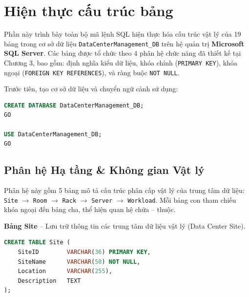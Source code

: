 \section{Hiện thực cấu trúc bảng}

Phần này trình bày toàn bộ mã lệnh SQL hiện thực hóa cấu trúc vật lý của 19 bảng trong cơ sở dữ liệu \texttt{DataCenterManagement\_DB} trên hệ quản trị \textbf{Microsoft SQL Server}. Các bảng được tổ chức theo 4 phân hệ chức năng đã thiết kế tại Chương 3, bao gồm: định nghĩa kiểu dữ liệu, khóa chính (\texttt{PRIMARY KEY}), khóa ngoại (\texttt{FOREIGN KEY REFERENCES}), và ràng buộc \texttt{NOT NULL}.

\vspace{0.5em}
\noindent Trước tiên, tạo cơ sở dữ liệu và chuyển ngữ cảnh sử dụng:

\begin{tcolorbox}[colback=gray!5, colframe=gray!60, title={\textbf{Khởi tạo Database}}, fonttitle=\bfseries\small, boxrule=0.5pt, arc=2pt]
\begin{lstlisting}[language=SQL, basicstyle=\ttfamily\small, breaklines=true, showstringspaces=false, keywordstyle=\bfseries\color{blue!70!black}, stringstyle=\color{red!70!black}, commentstyle=\itshape\color{green!50!black}]
CREATE DATABASE DataCenterManagement_DB;
GO

USE DataCenterManagement_DB;
GO
\end{lstlisting}
\end{tcolorbox}

\subsection{Phân hệ Hạ tầng \& Không gian Vật lý}

Phân hệ này gồm 5 bảng mô tả cấu trúc phân cấp vật lý của trung tâm dữ liệu: \texttt{Site} $\rightarrow$ \texttt{Room} $\rightarrow$ \texttt{Rack} $\rightarrow$ \texttt{Server} $\rightarrow$ \texttt{Workload}. Mỗi bảng con tham chiếu khóa ngoại đến bảng cha, thể hiện quan hệ chứa -- thuộc.

\vspace{0.5em}
\noindent\textbf{Bảng Site} -- Lưu trữ thông tin các trung tâm dữ liệu vật lý (Data Center Site).

\begin{tcolorbox}[colback=gray!5, colframe=gray!60, title={\textbf{CREATE TABLE Site}}, fonttitle=\bfseries\small, boxrule=0.5pt, arc=2pt]
\begin{lstlisting}[language=SQL, basicstyle=\ttfamily\small, breaklines=true, showstringspaces=false, keywordstyle=\bfseries\color{blue!70!black}, stringstyle=\color{red!70!black}, commentstyle=\itshape\color{green!50!black}]
CREATE TABLE Site (
    SiteID        VARCHAR(36) PRIMARY KEY,
    SiteName      VARCHAR(50) NOT NULL,
    Location      VARCHAR(255),
    Description   TEXT
);
\end{lstlisting}
\end{tcolorbox}

